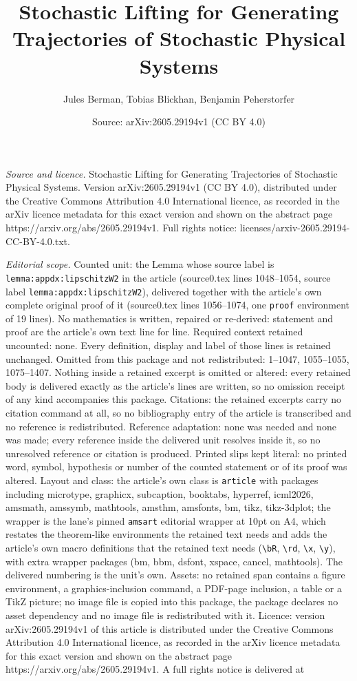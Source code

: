 \documentclass[10pt,a4paper]{amsart}
\title[Stochastic Lifting for Generating Trajectories of Stochastic]{Stochastic Lifting for Generating Trajectories of Stochastic Physical Systems}
\author{Jules Berman, Tobias Blickhan, Benjamin Peherstorfer}
\date{Source: arXiv:2605.29194v1 (CC BY 4.0)}
\begin{document}
\maketitle

\noindent\emph{Source and licence.} Stochastic Lifting for Generating Trajectories of Stochastic Physical Systems. Version arXiv:2605.29194v1 (CC BY 4.0), distributed under the Creative Commons Attribution 4.0 International licence, as recorded in the arXiv licence metadata for this exact version and shown on the abstract page https://arxiv.org/abs/2605.29194v1. Full rights notice: licenses/arxiv-2605.29194-CC-BY-4.0.txt.\par\smallskip

\noindent\textit{Editorial scope.} Counted unit: the Lemma whose source label is \texttt{lemma:appdx:lipschitzW2} in the article (source0.tex lines 1048--1054, source label \texttt{lemma:appdx:lipschitzW2}), delivered together with the article's own complete original proof of it (source0.tex lines 1056--1074, one \texttt{proof} environment of 19 lines). No mathematics is written, repaired or re-derived: statement and proof are the article's own text line for line. Required context retained uncounted: none. Every definition, display and label of those lines is retained unchanged. Omitted from this package and not redistributed: 1--1047, 1055--1055, 1075--1407. Nothing inside a retained excerpt is omitted or altered: every retained body is delivered exactly as the article's lines are written, so no omission receipt of any kind accompanies this package. Citations: the retained excerpts carry no citation command at all, so no bibliography entry of the article is transcribed and no reference is redistributed. Reference adaptation: none was needed and none was made; every reference inside the delivered unit resolves inside it, so no unresolved reference or citation is produced. Printed slips kept literal: no printed word, symbol, hypothesis or number of the counted statement or of its proof was altered. Layout and class: the article's own class is \texttt{article} with packages including microtype, graphicx, subcaption, booktabs, hyperref, icml2026, amsmath, amssymb, mathtools, amsthm, amsfonts, bm, tikz, tikz-3dplot; the wrapper is the lane's pinned \texttt{amsart} editorial wrapper at 10pt on A4, which restates the theorem-like environments the retained text needs and adds the article's own macro definitions that the retained text needs (\texttt{\textbackslash bR}, \texttt{\textbackslash rd}, \texttt{\textbackslash x}, \texttt{\textbackslash y}), with extra wrapper packages (bm, bbm, dsfont, xspace, cancel, mathtools). The delivered numbering is the unit's own. Assets: no retained span contains a figure environment, a graphics-inclusion command, a PDF-page inclusion, a table or a TikZ picture; no image file is copied into this package, the package declares no asset dependency and no image file is redistributed with it. Licence: version arXiv:2605.29194v1 of this article is distributed under the Creative Commons Attribution 4.0 International licence, as recorded in the arXiv licence metadata for this exact version and shown on the abstract page https://arxiv.org/abs/2605.29194v1. A full rights notice is delivered at 
\end{document}
